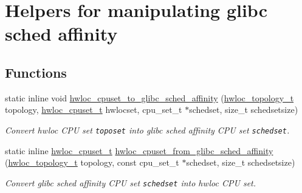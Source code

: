 \hypertarget{group__hwlocality__glibc__sched}{
\section{Helpers for manipulating glibc sched affinity}
\label{group__hwlocality__glibc__sched}
}
\subsection*{Functions}
\begin{CompactItemize}
\item 
static inline void \hyperlink{group__hwlocality__glibc__sched_g8d52ded42a9b3d832672d642798cdd8a}{hwloc\_\-cpuset\_\-to\_\-glibc\_\-sched\_\-affinity} (\hyperlink{group__hwlocality__topology_g9d1e76ee15a7dee158b786c30b6a6e38}{hwloc\_\-topology\_\-t} topology, \hyperlink{group__hwlocality__cpuset_g82e51d695c430832b703dad5ab8d75e4}{hwloc\_\-cpuset\_\-t} hwlocset, cpu\_\-set\_\-t $\ast$schedset, size\_\-t schedsetsize)
\begin{CompactList}\small\item\em Convert hwloc CPU set {\tt toposet} into glibc sched affinity CPU set {\tt schedset}. \item\end{CompactList}\item 
static inline \hyperlink{group__hwlocality__cpuset_g82e51d695c430832b703dad5ab8d75e4}{hwloc\_\-cpuset\_\-t} \hyperlink{group__hwlocality__glibc__sched_g95a1b94fc109895ee13b17bddac08f5f}{hwloc\_\-cpuset\_\-from\_\-glibc\_\-sched\_\-affinity} (\hyperlink{group__hwlocality__topology_g9d1e76ee15a7dee158b786c30b6a6e38}{hwloc\_\-topology\_\-t} topology, const cpu\_\-set\_\-t $\ast$schedset, size\_\-t schedsetsize)
\begin{CompactList}\small\item\em Convert glibc sched affinity CPU set {\tt schedset} into hwloc CPU set. \item\end{CompactList}\end{CompactItemize}


